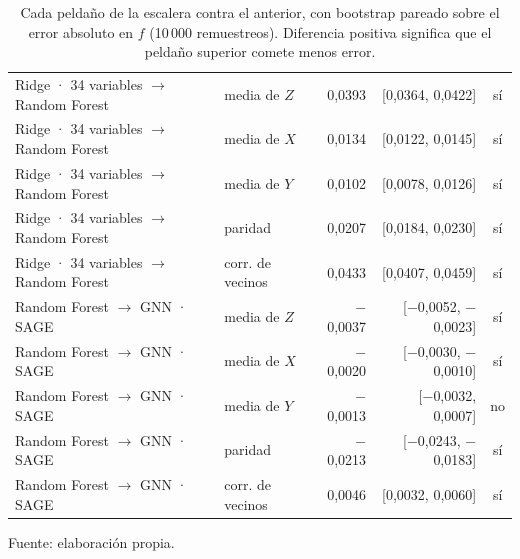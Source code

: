 \begin{table}[htbp]
{\begin{tabular}{@{}llrrc@{}}
        Ridge · 34 variables $\rightarrow$ Random Forest & media de $Z$ & 0,0393 & [0,0364, 0,0422] & sí \\
        Ridge · 34 variables $\rightarrow$ Random Forest & media de $X$ & 0,0134 & [0,0122, 0,0145] & sí \\
        Ridge · 34 variables $\rightarrow$ Random Forest & media de $Y$ & 0,0102 & [0,0078, 0,0126] & sí \\
        Ridge · 34 variables $\rightarrow$ Random Forest & paridad & 0,0207 & [0,0184, 0,0230] & sí \\
        Ridge · 34 variables $\rightarrow$ Random Forest & corr. de vecinos & 0,0433 & [0,0407, 0,0459] & sí \\
        Random Forest $\rightarrow$ GNN · SAGE & media de $Z$ & $-$0,0037 & [$-$0,0052, $-$0,0023] & sí \\
        Random Forest $\rightarrow$ GNN · SAGE & media de $X$ & $-$0,0020 & [$-$0,0030, $-$0,0010] & sí \\
        Random Forest $\rightarrow$ GNN · SAGE & media de $Y$ & $-$0,0013 & [$-$0,0032, 0,0007] & no \\
        Random Forest $\rightarrow$ GNN · SAGE & paridad & $-$0,0213 & [$-$0,0243, $-$0,0183] & sí \\
        Random Forest $\rightarrow$ GNN · SAGE & corr. de vecinos & 0,0046 & [0,0032, 0,0060] & sí \\
        \bottomrule
    \end{tabular}}

    \caption{Cada peldaño de la escalera contra el anterior, con bootstrap pareado sobre el error absoluto en $f$ (10\,000 remuestreos). Diferencia positiva significa que el peldaño superior comete menos error.}
    \label{tab:comparativa_escalera}

    {\footnotesize Fuente: elaboración propia.}
\end{table}

